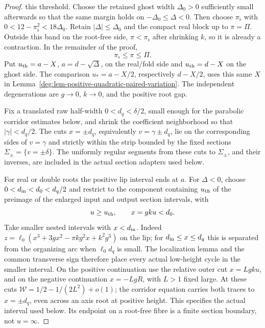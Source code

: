 \begin{proof}
this threshold. Choose the retained ghost width \(\Delta_0>0\)
sufficiently small afterwards so that the same margin holds on
\(-\Delta_0\le\Delta<0\). Then choose \(\pi_\flat\) with
\(0<12-\pi_\flat^2<18\Delta_0\).
Retain \(|\Delta|\le\Delta_0\) and the compact real block up to
\(\pi=\Pi\). Outside this band on the root-free side,
\(\pi<\pi_\flat\) after shrinking \(k\), so it is already a
contraction. In the remainder of the proof,
\begin{equation}
 \pi_\flat\le\pi\le\Pi.
 \label{deg:quadratic-pi-lower}
\end{equation}
Put \(u_{\rm th}=a-X\), \(a=d-\sqrt\Delta\), on the real/fold
side and \(u_{\rm th}=d-X\) on the ghost side.
The comparison \(u_*=a-X/2\), respectively \(d-X/2\), uses
this same \(X\) in Lemma~\ref{deg:lem-positive-quadratic-paired-variation}.
The independent degenerations are \(g\to0\), \(k\to0\), and the
positive root gap.

Fix a translated raw half-width \(0<d_q<\delta/2\), small enough for the
parabolic corridor estimates below, and shrink the coefficient neighborhood
so that \(|\gamma|<d_q/2\).  The cuts \(x=\pm d_q\), equivalently
\(v=\gamma\pm d_q\), lie on the corresponding sides of \(v=\gamma\) and
strictly within the strip bounded by the fixed sections
\(\Sigma_\pm=\{v=\pm\delta\}\).  The uniformly regular segments from these
cuts to \(\Sigma_\pm\), and their inverses, are included in the actual
section adapters used below.

For real or double roots the positive lip interval ends at \(a\).
For \(\Delta<0\), choose \(0<d_{\rm in}<d_0<d_q/2\) and restrict to
the component containing \(u_{\rm th}\) of the preimage of the
enlarged input and output section intervals, with
\[
 u\ge u_{\rm th},\qquad x=gku<d_0.
\]
Take smaller nested intervals with \(x<d_{\rm in}\).
Indeed \(z=\ell_0(x^3+3gx^2-\pi kg^2x+k^2g^3)\) on the lip;
for \(d_{\rm in}\le x\le d_q\) this is separated from the
organizing arc when \(\ell_0d_q\) is small.  The localization lemma
and the common transverse sign therefore place every actual low-height
cycle in the smaller interval.  On the positive continuation use the
relative outer cut \(x=L gku\), and on the negative continuation
\(x=-LgR\), with \(L>1\) fixed large.  At these cuts
\(\mathcal W=1/2-1/(2L^2)+o(1)\); the corridor equation carries
both traces to \(x=\pm d_q\), even across an axis root at positive
height.  This specifies the actual interval used below.  Its endpoint
on a root-free fibre is a finite section boundary, not \(u=\infty\).


\end{proof}
